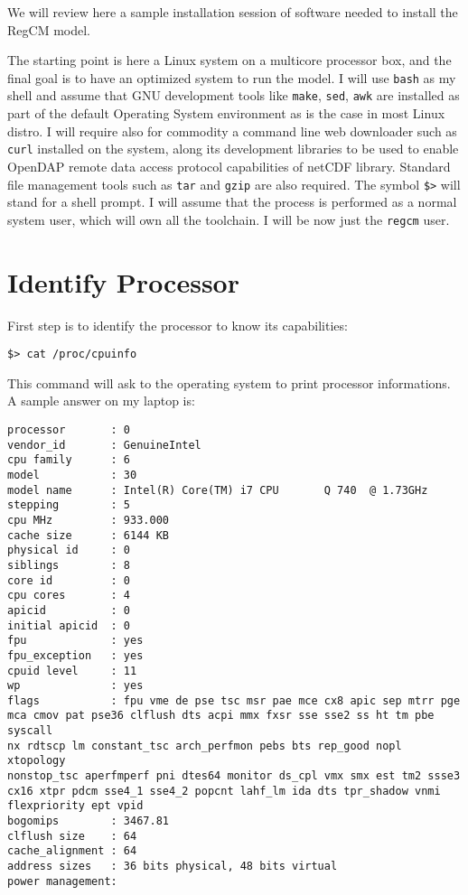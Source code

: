 %
%

We will review here a sample installation session of software needed to
install the RegCM model.

The starting point is here a Linux system on a multicore processor box, and the final
goal is to have an optimized system to run the model.
I will use \verb=bash= as my shell and assume that GNU development tools like
\verb=make=, \verb=sed=, \verb=awk= are installed as part of the default
Operating System environment as is the case in most Linux distro.
I will require also for commodity a command line web downloader such as
\verb=curl= installed on the system, along its development libraries to be
used to enable OpenDAP remote data access protocol capabilities of netCDF
library. Standard file management tools such as \verb=tar= and \verb=gzip=
are also required.
The symbol \verb=$>= will stand for a shell prompt.
I will assume that the process is performed as a normal system user, which
will own all the toolchain. I will be now just the \verb=regcm= user.

\section{Identify Processor}

First step is to identify the processor to know its capabilities:

\begin{Verbatim}
$> cat /proc/cpuinfo
\end{Verbatim}

This command will ask to the operating system to print processor informations.
A sample answer on my laptop is:

\begin{Verbatim}
processor       : 0
vendor_id       : GenuineIntel
cpu family      : 6
model           : 30
model name      : Intel(R) Core(TM) i7 CPU       Q 740  @ 1.73GHz
stepping        : 5
cpu MHz         : 933.000
cache size      : 6144 KB
physical id     : 0
siblings        : 8
core id         : 0
cpu cores       : 4
apicid          : 0
initial apicid  : 0
fpu             : yes
fpu_exception   : yes
cpuid level     : 11
wp              : yes
flags           : fpu vme de pse tsc msr pae mce cx8 apic sep mtrr pge
mca cmov pat pse36 clflush dts acpi mmx fxsr sse sse2 ss ht tm pbe syscall
nx rdtscp lm constant_tsc arch_perfmon pebs bts rep_good nopl xtopology
nonstop_tsc aperfmperf pni dtes64 monitor ds_cpl vmx smx est tm2 ssse3
cx16 xtpr pdcm sse4_1 sse4_2 popcnt lahf_lm ida dts tpr_shadow vnmi
flexpriority ept vpid
bogomips        : 3467.81                                                       
clflush size    : 64                                                            
cache_alignment : 64                                                            
address sizes   : 36 bits physical, 48 bits virtual                             
power management:
\end{Verbatim}

